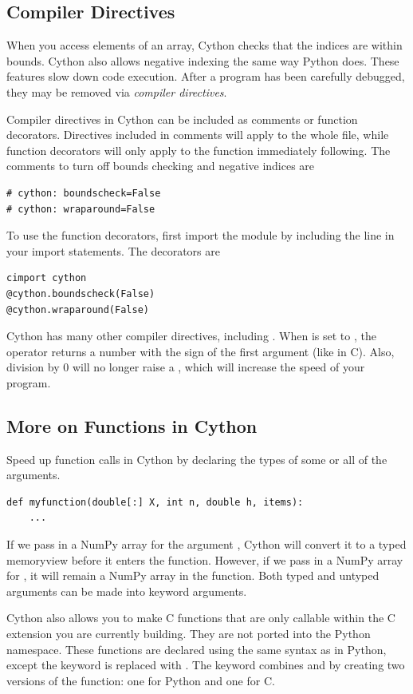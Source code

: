 \subsection*{Compiler Directives}
When you access elements of an array, Cython checks that the indices are within bounds.
Cython also allows negative indexing the same way Python does.
These features slow down code execution.
After a program has been carefully debugged, they may be removed via \emph{compiler directives}.

Compiler directives in Cython can be included as comments or function decorators.
Directives included in comments will apply to the whole file, while function decorators will only apply to the function immediately following.
The comments to turn off bounds checking and negative indices are
\begin{lstlisting}
# cython: boundscheck=False
# cython: wraparound=False
\end{lstlisting}
To use the function decorators, first import the  module by including the line  in your import statements.
The decorators are
\begin{lstlisting}
cimport cython
@cython.boundscheck(False)
@cython.wraparound(False)
\end{lstlisting}

Cython has many other compiler directives, including .
When  is set to , the \li{\%} operator returns a number with the sign of the first argument (like in C).
Also, division by 0 will no longer raise a , which will increase the speed of your program.

\subsection*{More on Functions in Cython}
Speed up function calls in Cython by declaring the types of some or all of the arguments.
\begin{lstlisting}
def myfunction(double[:] X, int n, double h, items):
    ...
\end{lstlisting}
If we pass in a NumPy array for the argument , Cython will convert it to a typed memoryview before it enters the function.
However, if we pass in a NumPy array for , it will remain a NumPy array in the function.
Both typed and untyped arguments can be made into keyword arguments.

Cython also allows you to make C functions that are only callable within the C extension you are currently building.
They are not ported into the Python namespace.
These functions are declared using the same syntax as in Python, except the keyword  is replaced with .
The keyword  combines  and  by creating two versions of the function: one for Python and one for C.


